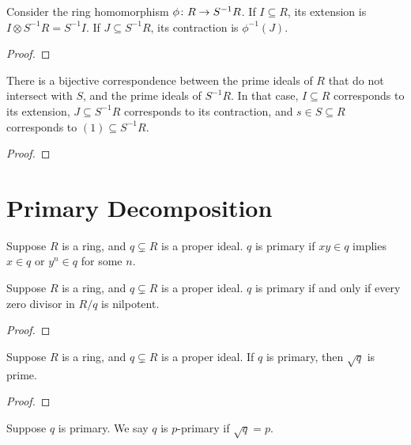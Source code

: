 \begin{proposition}
    Consider the ring homomorphism \(\phi\colon R\to S^{-1}R\).
    If \(I \subseteq R\), its extension is \(I \otimes S^{-1}R = S^{-1}I\).
    If \(J \subseteq S^{-1}R\), its contraction is \(\phi^{-1}(J)\).
\end{proposition}
\begin{proof}
    
\end{proof}
\begin{theorem}
    There is a bijective correspondence between 
    the prime ideals of \(R\) that do not intersect with \(S\),
    and the prime ideals of \(S^{-1}R\).
    In that case, \(I \subseteq R\) corresponds to its extension,
    \(J \subseteq S^{-1}R\) corresponds to its contraction,
    and \(s \in S \subseteq R\) corresponds to \((1) \subseteq S^{-1}R\).
\end{theorem}
\begin{proof}
    
\end{proof}


\section{Primary Decomposition}

\begin{definition}
    Suppose \(R\) is a ring, and \(q \subsetneq R\) is a proper ideal.
    \(q\) is primary if \(xy \in q\) implies \(x \in q\) or \(y^n \in q\) for some \(n\).
\end{definition}
\begin{proposition}
    Suppose \(R\) is a ring, and \(q \subsetneq R\) is a proper ideal.
    \(q\) is primary if and only if every zero divisor in \(R/q\) is nilpotent.
\end{proposition}
\begin{proof}
    
\end{proof}
\begin{theorem}
    Suppose \(R\) is a ring, and \(q \subsetneq R\) is a proper ideal.
    If \(q\) is primary, then \(\sqrt{q}\) is prime.
\end{theorem}
\begin{proof}
    
\end{proof}
\begin{definition}
    Suppose \(q\) is primary.
    We say \(q\) is \(p\)-primary if \(\sqrt{q} = p\).
\end{definition}

